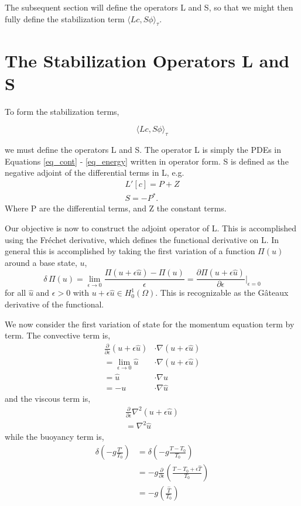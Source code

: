The subsequent section will define the operators L and S, so that we
might then fully define the stabilization term $\langle Lc,S\phi
\rangle_\tau$. 

%
%
\section{The Stabilization Operators L and S}


To form the stabilization terms, 

\begin{equation}
 \langle Lc,S\phi \rangle_\tau
\end{equation}

we must define the operators L and S. The operator L is simply the PDEs
in Equations \ref{eq_cont} - \ref{eq_energy} written in operator form. S is
defined as the negative adjoint of the differential terms in L, e.g.
\begin{align}
 L'[c] = P + Z \\
 S = -P^*. 
\end{align}
Where P are the differential terms, and Z the constant terms. 

Our objective is now to construct the adjoint operator of L. This is
accomplished using the Fr\'echet derivative, which defines the
functional derivative on L. In general this is accomplished by taking
the first variation of a function $\Pi(u)$ around a base state, $u$,
\begin{equation}
 \delta\, \Pi(u) = \lim_{\epsilon \to 0} \frac{\Pi(u+\epsilon \hat u) -
  \Pi(u)}{\epsilon} =
  \frac{\partial \Pi(u +\epsilon \hat u)}{\partial \epsilon}
  \bigg|_{\epsilon = 0}
\end{equation}
for all $\hat u$ and $\epsilon > 0$ with $u + \epsilon \hat u \in
H^1_0(\Omega)$. This is recognizable as the G\^{a}teaux
derivative of the functional. 


We now consider the first variation of state for the momentum equation
term by term. The convective term is, 
\begin{align}
 \frac{\partial}{\partial \epsilon} (u + \epsilon \hat u) &\cdot \nabla
  (u + \epsilon \hat u) \\
 = \lim_{\epsilon \to 0} \hat u &\cdot \nabla (u + \epsilon \hat u) \\
 = \hat u & \cdot \nabla u \\
 = - u &\cdot \nabla \hat u
\end{align}
and the viscous term is, 
\begin{align}
 \frac{\partial}{\partial \epsilon} \nabla^2 (u + \epsilon \hat u) \\
 = \nabla^2 \hat u
\end{align}
while the buoyancy term is, 
\begin{align}
 \delta \left(-g \frac{T'}{T_0}\right) &= \delta \left( -g
 \frac{T-T_0}{T_0} \right) \\
 &= -g \frac{\partial}{\partial \epsilon} \left( \frac{T-T_0+\epsilon
 \hat T}{T_0} \right) \\
 &= -g \left( \frac{\hat T}{T_0} \right) 
\end{align}


